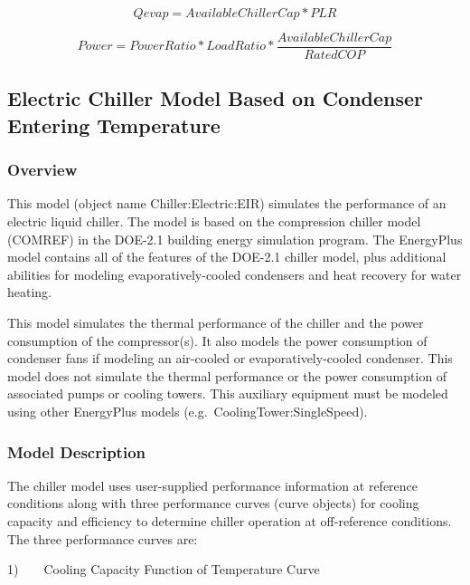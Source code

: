 \begin{equation}
Qevap = AvailableChillerCap*PLR
\end{equation}

\begin{equation}
Power = PowerRatio*LoadRatio*\frac{{AvailableChillerCap}}{{RatedCOP}}
\end{equation}

\subsection{Electric Chiller Model Based on Condenser Entering Temperature}\label{electric-chiller-model-based-on-condenser-entering-temperature}

\subsubsection{Overview}\label{overview-2-003}

This model (object name Chiller:Electric:EIR) simulates the performance of an electric liquid chiller. The model is based on the compression chiller model (COMREF) in the DOE-2.1 building energy simulation program. The EnergyPlus model contains all of the features of the DOE-2.1 chiller model, plus additional abilities for modeling evaporatively-cooled condensers and heat recovery for water heating.

This model simulates the thermal performance of the chiller and the power consumption of the compressor(s). It also models the power consumption of condenser fans if modeling an air-cooled or evaporatively-cooled condenser. This model does not simulate the thermal performance or the power consumption of associated pumps or cooling towers. This auxiliary equipment must be modeled using other EnergyPlus models (e.g.~CoolingTower:SingleSpeed).

\subsubsection{Model Description}\label{model-description-2-003}

The chiller model uses user-supplied performance information at reference conditions along with three performance curves (curve objects) for cooling capacity and efficiency to determine chiller operation at off-reference conditions. The three performance curves are:

1)~~~~Cooling Capacity Function of Temperature Curve

